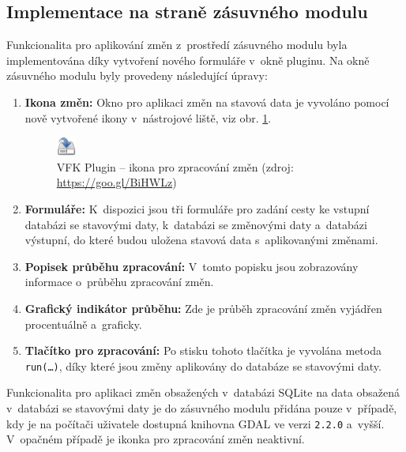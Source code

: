\documentclass[a4paper,12pt,oneside]{book}
\begin{document}
\newpage
\subsection{Implementace na straně zásuvného modulu}
\label{l_implementace_zmen}
Funkcionalita pro aplikování změn z~prostředí zásuvného modulu byla
implementována díky vytvoření nového formuláře v~okně pluginu. Na okně
zásuvného modulu byly provedeny následující úpravy:

\begin{enumerate}
\item \textbf{Ikona změn:} Okno pro aplikaci změn na stavová data je
  vyvoláno pomocí nově vytvořené ikony v~nástrojové liště, viz
  obr. \ref{l_ikona_zmen}.

\begin{figure}[htb]
\centering
\includegraphics[scale=0.9]{images/applyChanges.png}
\caption[VFK Plugin -- ikona pro zpracování změn]{VFK Plugin -- ikona pro zpracování změn (zdroj: \url{https://goo.gl/BiHWLz})}
\label{l_ikona_zmen}
\end{figure} 
 
\item \textbf{Formuláře:} K~dispozici jsou tři formuláře pro zadání
  cesty ke vstupní databázi se stavovými daty, k~databázi se změnovými
  daty a~databázi výstupní, do které budou uložena stavová data
  s~aplikovanými změnami.
 
\item \textbf{Popisek průběhu zpracování:} V~tomto popisku jsou
  zobrazovány informace o~průběhu zpracování změn.
 
\item \textbf{Grafický indikátor průběhu:} Zde je průběh zpracování
  změn vyjádřen procentuálně a~graficky.
 
\item \textbf{Tlačítko pro zpracování:} Po stisku tohoto tlačítka
  je vyvolána metoda \texttt{run(\dots)}, díky které jsou změny
  aplikovány do databáze se stavovými daty.
 
\end{enumerate}

Funkcionalita pro aplikaci změn obsažených v~databázi SQLite na data
obsažená v~databázi se stavovými daty je do zásuvného modulu přidána
pouze v~případě, kdy je na počítači uživatele dostupná knihovna GDAL
ve verzi \texttt{2.2.0} a~vyšší. V~opačném případě je ikonka pro
zpracování změn neaktivní.
\end{document}
